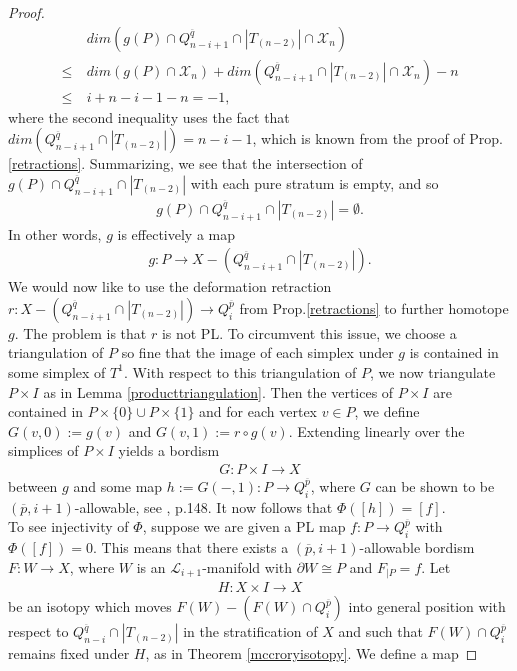 \documentclass{scrreprt}
\begin{document}
\begin{proof}
\begin{align*}
&dim(g(P) \cap Q_{n-i+1}^{\overline{q}} \cap |T_{(n-2)}| \cap \mathcal{X}_{n}) \\ \leq \ &dim(g(P) \cap \mathcal{X}_{n}) + dim(Q_{n-i+1}^{\overline{q}} \cap |T_{(n-2)}| \cap \mathcal{X}_{n}) - n \\ \leq \ &i+n-i-1-n = -1,
\end{align*}
where the second inequality uses the fact that $dim(Q_{n-i+1}^{\overline{q}} \cap |T_{(n-2)}|) = n-i-1$, which is known from the proof of Prop.\ref{retractions}. Summarizing, we see that the intersection of $g(P) \cap Q_{n-i+1}^{\overline{q}} \cap |T_{(n-2)}|$ with each pure stratum is empty, and so
\begin{align*}
g(P) \cap Q_{n-i+1}^{\overline{q}} \cap |T_{(n-2)}| = \emptyset.
\end{align*}
In other words, $g$ is effectively a map 
\begin{align*}
g: P \to X-(Q_{n-i+1}^{\overline{q}} \cap |T_{(n-2)}|).
\end{align*}
We would now like to use the deformation retraction $r: X-(Q_{n-i+1}^{\overline{q}} \cap |T_{(n-2)}|) \to Q_i^{\overline{p}}$ from Prop.\ref{retractions} to further homotope $g$. The problem is that $r$ is not PL. To circumvent this issue, we choose a triangulation of $P$ so fine that the image of each simplex under $g$ is contained in some simplex of $T^1$. With respect to this triangulation of $P$, we now triangulate $P \times I$ as in Lemma \ref{producttriangulation}. Then the vertices of $P \times I$ are contained in $P \times \{ 0 \} \cup P \times \{ 1 \}$ and for each vertex $v \in P$, we define $G(v,0):=g(v)$ and $G(v,1):= r \circ g (v)$. Extending linearly over the simplices of $P \times I$ yields a bordism 
\begin{align*}
G: P \times I \to X
\end{align*}
between $g$ and some map $h:=G(-,1):P \to Q_i^{\overline{p}}$, where $G$ can be shown to be $(\overline{p},i+1)$-allowable, see \cite{GM}, p.148. It now follows that 
$\Phi([h])=[f].$ \\
To see injectivity of $\Phi$, suppose we are given a PL map $f: P \to Q_i^{\overline{p}}$ with $\Phi([f])=0$. This means that there exists a $(\overline{p},i+1)$-allowable bordism $F:W \to X$, where $W$ is an $\mathcal{L}_{i+1}$-manifold with $\partial W \cong P$ and $F_{|P}=f$. Let
\begin{align*}
H: X \times I \to X
\end{align*}
be an isotopy which moves $F(W)-(F(W) \cap Q_i^{\overline{p}})$ into general position with respect to $Q_{n-i}^{\overline{q}} \cap |T_{(n-2)}|$ in the stratification of $X$ and such that $F(W) \cap Q_i^{\overline{p}}$ remains fixed under $H$, as in Theorem \ref{mccroryisotopy}. We define a map

\end{proof}
\end{document}
